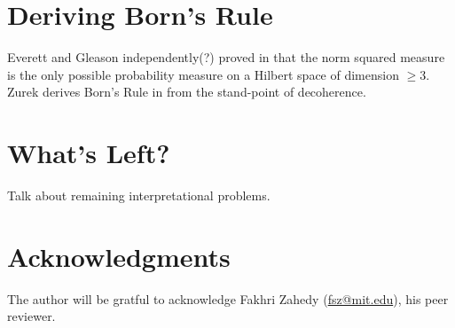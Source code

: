 \documentclass[aps,prd,final,twocolumn,10pt,longbibliography,nobibnotes]{revtex4-1}
\begin{document}
\allowbreak
\section{Deriving Born's Rule}
  Everett and Gleason independently(?) proved in \cite{Gleason1957, Everett1957} that the norm squared measure is the only possible probability measure on a Hilbert space of dimension $\ge 3$.  Zurek derives Born's Rule in \cite{zurek2003decoherence,Zurek2007,Zurek2005} from the stand-point of decoherence. 

\allowbreak
\section{What's Left?}
  Talk about remaining interpretational problems.
  
\section*{Acknowledgments}
  The author will be gratful to acknowledge Fakhri Zahedy (\href{mailto:fsz@mit.edu}{fsz@mit.edu}), his peer reviewer.
  
 


\nocite{*}

\end{document}
